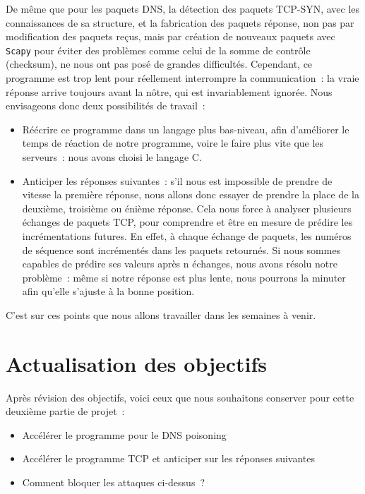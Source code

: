 \documentclass[a4paper, 12pt,twoside]{article}
\begin{document}
        De même que pour les paquets DNS, la détection des paquets TCP-SYN, avec les connaissances de sa structure, et la fabrication des paquets réponse, non pas par modification des paquets reçus, mais par création de nouveaux paquets avec \verb!Scapy! pour éviter des problèmes comme celui de la somme de contrôle (checksum), ne nous ont pas posé de grandes difficultés. Cependant, ce programme est trop lent pour réellement interrompre la communication~: la vraie réponse arrive toujours avant la nôtre, qui est invariablement ignorée. Nous envisageons donc deux possibilités de travail~:
        \begin{itemize}[label=\color{bleu303}\textbullet{}]
            \item Réécrire ce programme dans un langage plus bas-niveau, afin d'améliorer le temps de réaction de notre programme, voire le faire plus vite que les serveurs~: nous avons choisi le langage C.
            \item Anticiper les réponses suivantes~: s'il nous est impossible de prendre de vitesse la première réponse, nous allons donc essayer de prendre la place de la deuxième, troisième ou énième réponse. Cela nous force à analyser plusieurs échanges de paquets TCP, pour comprendre et être en mesure de prédire les incrémentations futures. En effet, à chaque échange de paquets, les numéros de séquence sont incrémentés dans les paquets retournés. Si nous sommes capables de prédire ses valeurs après n échanges, nous avons résolu notre problème~: même si notre réponse est plus lente, nous pourrons la minuter afin qu'elle s'ajuste à la bonne position.
        \end{itemize}


        C'est sur ces points que nous allons travailler dans les semaines à venir.
\clearpage

\section{Actualisation des objectifs}

    Après révision des objectifs, voici ceux que nous souhaitons conserver pour cette deuxième partie de projet~:

    \begin{itemize}[label=\color{bleu303}\textbullet{}]
        \item Accélérer le programme pour le DNS poisoning
        \item Accélérer le programme TCP et anticiper sur les réponses suivantes
        \item Comment bloquer les attaques ci-dessus~?
    \end{itemize}
\end{document}
